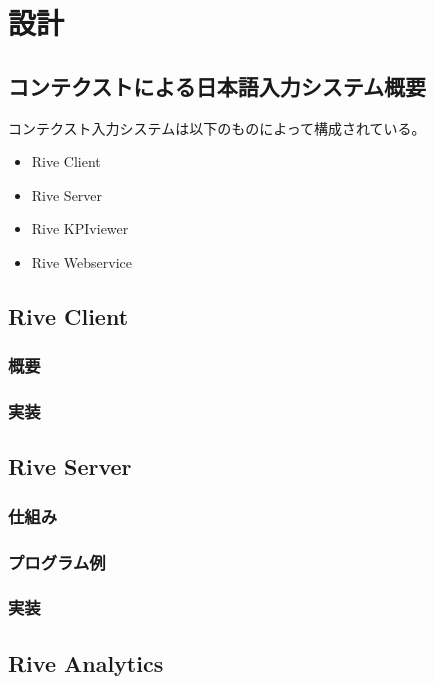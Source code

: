 \chapter{設計}
\label{chap:design}

\section{コンテクストによる日本語入力システム概要}

コンテクスト入力システムは以下のものによって構成されている。

\begin{itemize}
  \item Rive Client
  \item Rive Server
  \item Rive KPIviewer
  \item Rive Webservice
\end{itemize}


\section{Rive Client}
\subsection{概要}
\subsection{実装}

\section{Rive Server}
\subsection{仕組み}
\subsection{プログラム例}
\subsection{実装}

\section{Rive Analytics}
